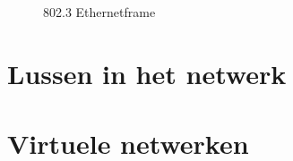 \begin{figure}
    \centering
    
    \caption{802.3 Ethernetframe}
    \label{fig:ethernet-frame}
\end{figure}



\section{Lussen in het netwerk}
\label{sec:stp}


\section{Virtuele netwerken}
\label{sec:vlan}